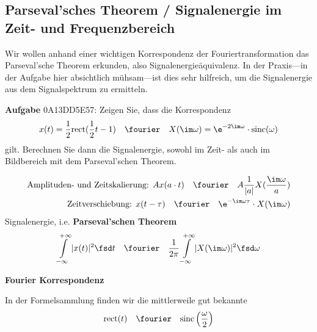 \subsection{Parseval'sches Theorem / Signalenergie im Zeit- und Frequenzbereich}
\label{sec:0A13DD5E57}
\begin{Ziel}
Wir wollen anhand einer wichtigen Korrespondenz der Fouriertransformation das
Parseval'sche Theorem erkunden, also Signalenergieäquivalenz.
In der Praxis---in der Aufgabe hier absichtlich mühsam---ist dies sehr hilfreich,
um die Signalenergie aus dem Signalspektrum zu ermitteln.
\end{Ziel}
\textbf{Aufgabe} {\tiny 0A13DD5E57}: Zeigen Sie, dass die Korrespondenz
\begin{equation}
x(t) = \frac{1}{2} \mathrm{rect}(\frac{1}{2}t - 1) \quad\fourier\quad X(\im\omega)=\e^{-2 \im \omega} \cdot \mathrm{sinc}(\omega)
\end{equation}
gilt.
Berechnen Sie dann die Signalenergie, sowohl im Zeit- als auch im Bildbereich mit dem
Parseval'schen Theorem.
\begin{Werkzeug}
\begin{align}
\text{Amplituden- und Zeitskalierung:   } A x(a \cdot t) \quad\fourier\quad A \frac{1}{|a|} X(\frac{\im\omega}{a})\\
\text{Zeitverschiebung:  } x(t - \tau)  \quad\fourier\quad \e^{-\im \omega \tau} \cdot X(\im\omega)
\end{align}
Signalenergie, i.e. \textbf{Parseval'schen Theorem}
\begin{equation}
  \int\limits_{-\infty}^{+\infty} |x(t)|^2 \fsd t
  \quad\fourier\quad
  \frac{1}{2\pi}\int\limits_{-\infty}^{+\infty} |X(\im\omega)|^2 \fsd \omega
\end{equation}
\end{Werkzeug}
\begin{Ansatz}
\textbf{Fourier Korrespondenz}

In der Formelsammlung finden wir die mittlerweile gut bekannte
\begin{equation}
\mathrm{rect}(t) \quad\fourier\quad \mathrm{sinc}\left(\frac{\omega}{2}\right)
\end{equation}
\end{Ansatz}
